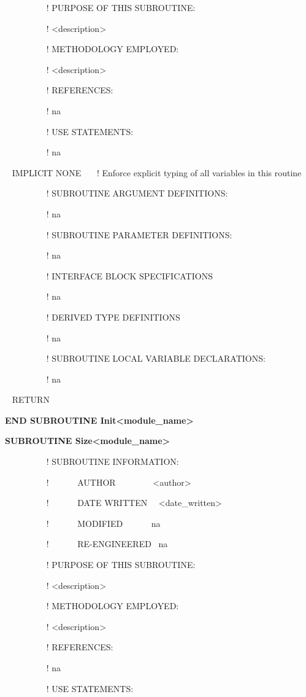 ~~~~~~~~~ ! PURPOSE OF THIS SUBROUTINE:

~~~~~~~~~ ! \textless{}description\textgreater{}

~~~~~~~~~ ! METHODOLOGY EMPLOYED:

~~~~~~~~~ ! \textless{}description\textgreater{}

~~~~~~~~~ ! REFERENCES:

~~~~~~~~~ ! na

~~~~~~~~~ ! USE STATEMENTS:

~~~~~~~~~ ! na

~ IMPLICIT NONE~~~ ! Enforce explicit typing of all variables in this routine

~~~~~~~~~ ! SUBROUTINE ARGUMENT DEFINITIONS:

~~~~~~~~~ ! na

~~~~~~~~~ ! SUBROUTINE PARAMETER DEFINITIONS:

~~~~~~~~~ ! na

~~~~~~~~~ ! INTERFACE BLOCK SPECIFICATIONS

~~~~~~~~~ ! na

~~~~~~~~~ ! DERIVED TYPE DEFINITIONS

~~~~~~~~~ ! na

~~~~~~~~~ ! SUBROUTINE LOCAL VARIABLE DECLARATIONS:

~~~~~~~~~ ! na

~ RETURN

\textbf{END SUBROUTINE Init\textless{}module\_name\textgreater{}}

\textbf{SUBROUTINE Size\textless{}module\_name\textgreater{}}

~~~~~~~~~ ! SUBROUTINE INFORMATION:

~~~~~~~~~ !~~~~~~ AUTHOR~~~~~~~~ \textless{}author\textgreater{}

~~~~~~~~~ !~~~~~~ DATE WRITTEN~~ \textless{}date\_written\textgreater{}

~~~~~~~~~ !~~~~~~ MODIFIED~~~~~~ na

~~~~~~~~~ !~~~~~~ RE-ENGINEERED~ na

~~~~~~~~~ ! PURPOSE OF THIS SUBROUTINE:

~~~~~~~~~ ! \textless{}description\textgreater{}

~~~~~~~~~ ! METHODOLOGY EMPLOYED:

~~~~~~~~~ ! \textless{}description\textgreater{}

~~~~~~~~~ ! REFERENCES:

~~~~~~~~~ ! na

~~~~~~~~~ ! USE STATEMENTS:

